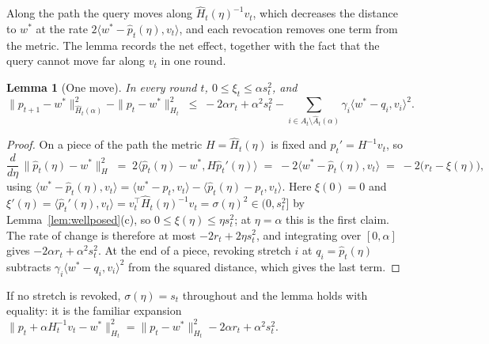 \documentclass[11pt]{article}
\theoremstyle{plain}
\newtheorem{lemma}[theorem]{Lemma}
\theoremstyle{definition}
\theoremstyle{remark}
\newcommand{\wstar}{w^{\ast}}
\newcommand{\ip}[2]{\langle #1, #2\rangle}
\begin{document}
Along the path the query moves along $\hat H_t(\eta)^{-1}v_t$, which decreases the distance to
$\wstar$ at the rate $2\ip{\wstar-\hat p_t(\eta)}{v_t}$, and each revocation removes one term from
the metric. The lemma records the net effect, together with the fact that the query cannot move far
along $v_t$ in one round.

\begin{lemma}[One move]\label{lem:path}
In every round $t$, $0\le\xi_t\le\alpha s_t^{2}$, and
\[
  \|p_{t+1}-\wstar\|_{\hat H_t(\alpha)}^{2}-\|p_t-\wstar\|_{H_t}^{2}
  \;\le\;-2\alpha r_t+\alpha^{2}s_t^{2}
  -\sum_{i\in A_t\setminus\hat A_t(\alpha)}\gamma_i\ip{\wstar-q_i}{v_i}^{2} .
\]
\end{lemma}

\begin{proof}
On a piece of the path the metric $H=\hat H_t(\eta)$ is fixed and $\hat p_t'=H^{-1}v_t$, so
\[
  \frac{d}{d\eta}\,\|\hat p_t(\eta)-\wstar\|_{H}^{2}\;=\;2\ip{\hat p_t(\eta)-\wstar}{H\hat p_t'(\eta)}
  \;=\;-2\ip{\wstar-\hat p_t(\eta)}{v_t}\;=\;-2\bigl(r_t-\xi(\eta)\bigr) ,
\]
using $\ip{\wstar-\hat p_t(\eta)}{v_t}=\ip{\wstar-p_t}{v_t}-\ip{\hat p_t(\eta)-p_t}{v_t}$. Here
$\xi(0)=0$ and $\xi'(\eta)=\ip{\hat p_t'(\eta)}{v_t}=v_t^{\top}\hat H_t(\eta)^{-1}v_t=\sigma(\eta)^{2}
\in(0,s_t^{2}]$ by Lemma~\ref{lem:wellposed}(c), so $0\le\xi(\eta)\le\eta s_t^{2}$; at $\eta=\alpha$
this is the first claim. The rate of change is therefore at most $-2r_t+2\eta s_t^{2}$, and
integrating over $[0,\alpha]$ gives $-2\alpha r_t+\alpha^{2}s_t^{2}$. At the end of a piece, revoking
stretch $i$ at $q_i=\hat p_t(\eta)$ subtracts $\gamma_i\ip{\wstar-q_i}{v_i}^{2}$ from the squared
distance, which gives the last term.
\end{proof}

If no stretch is revoked, $\sigma(\eta)=s_t$ throughout and the lemma holds with equality: it is the
familiar expansion
$\|p_t+\alpha H_t^{-1}v_t-\wstar\|_{H_t}^{2}=\|p_t-\wstar\|_{H_t}^{2}-2\alpha r_t+\alpha^{2}s_t^{2}$.
\end{document}
